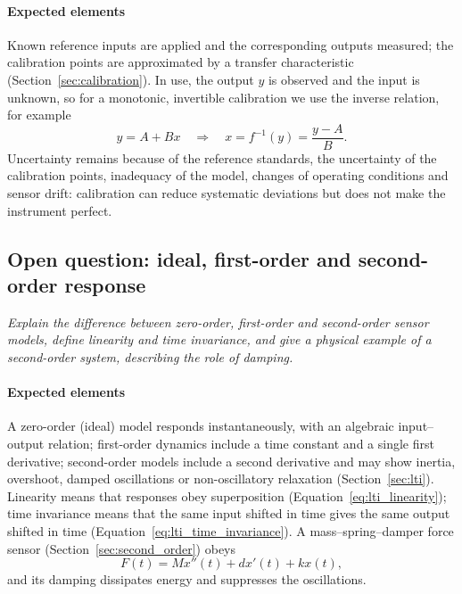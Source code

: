\paragraph{Expected elements} Known reference inputs are applied and the corresponding outputs measured; the calibration points are approximated by a transfer characteristic (Section~\ref{sec:calibration}). In use, the output $y$ is observed and the input is unknown, so for a monotonic, invertible calibration we use the inverse relation, for example
\begin{equation*}
y = A + Bx \quad \Longrightarrow \quad x = f^{-1}(y) = \frac{y - A}{B}.
\end{equation*}
Uncertainty remains because of the reference standards, the uncertainty of the calibration points, inadequacy of the model, changes of operating conditions and sensor drift: calibration can reduce systematic deviations but does not make the instrument perfect.

\subsection{Open question: ideal, first-order and second-order response}

\emph{Explain the difference between zero-order, first-order and second-order sensor models, define linearity and time invariance, and give a physical example of a second-order system, describing the role of damping.}

\paragraph{Expected elements} A zero-order (ideal) model responds instantaneously, with an algebraic input--output relation; first-order dynamics include a time constant and a single first derivative; second-order models include a second derivative and may show inertia, overshoot, damped oscillations or non-oscillatory relaxation (Section~\ref{sec:lti}). Linearity means that responses obey superposition (Equation~\eqref{eq:lti_linearity}); time invariance means that the same input shifted in time gives the same output shifted in time (Equation~\eqref{eq:lti_time_invariance}). A mass--spring--damper force sensor (Section~\ref{sec:second_order}) obeys
\begin{equation*}
F(t) = Mx''(t) + dx'(t) + kx(t),
\end{equation*}
and its damping dissipates energy and suppresses the oscillations.

